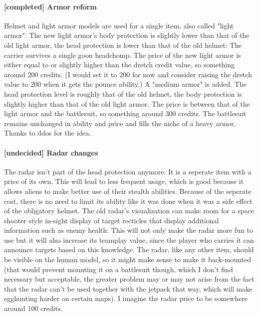 \documentclass{scrartcl}
\newcommand{\undecided}[0]{\textcolor{undecided}{\textbf{[undecided] }}}
\newcommand{\completed}[0]{\textcolor{completed}{\textbf{[completed] }}}
\begin{document}
\paragraph{\completed Armor reform}

Helmet and light armor models are used for a single item, also called "light armor". The new light armor's body protection is slightly lower than that of the old light armor, the head protection is lower than that of the old helmet: The carrier survives a single goon headchomp. The price of the new light armor is either equal to or slightly higher than the dretch credit value, so something around 200 credits. (I would set it to 200 for now and consider raising the dretch value to 200 when it gets the pounce ability.) A "medium armor" is added. The head protection level is roughly that of the old helmet, the body protection is slightly higher than that of the old light armor. The price is between that of the light armor and the battlesuit, so something around 300 credits. The battlesuit remains unchanged in ability and price and fills the niche of a heavy armor. Thanks to ddos for the idea.

\paragraph{\undecided Radar changes}

The radar isn't part of the head protection anymore. It is a seperate item with a price of its own. This will lead to less frequent usage, which is good because it allows aliens to make better use of their stealth abilities. Because of the seperate cost, there is no need to limit its ability like it was done when it was a side effect of the obligatory helmet. The old radar's visualization can make room for a space shooter style in-sight display of target recticles that display additional information such as enemy health. This will not only make the radar more fun to use but it will also increase its teamplay value, since the player who carries it can announce targets based on this knowledge. The radar, like any other item, should be visible on the human model, so it might make sense to make it back-mounted (that would prevent mounting it on a battlesuit though, which I don't find necessary but acceptable, the greater problem may or may not arise from the fact that the radar can't be used together with the jetpack that way, which will make egghunting harder on certain maps). I imagine the radar price to be somewhere around 100 credits.
\end{document}
